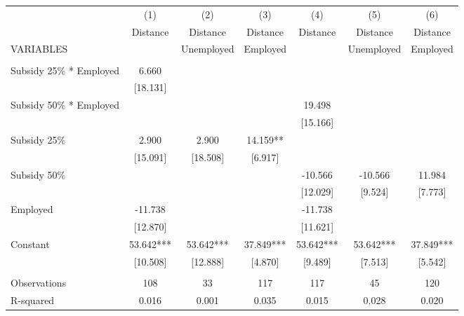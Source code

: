 \begin{tabular}{lcccccc} \hline
 & (1) & (2) & (3) & (4) & (5) & (6) \\
 & Distance & Distance & Distance & Distance & Distance & Distance \\
VARIABLES &  & Unemployed & Employed &  & Unemployed & Employed \\ \hline
 &  &  &  &  &  &  \\
Subsidy 25\% * Employed & 6.660 &  &  &  &  &  \\
 & [18.131] &  &  &  &  &  \\
Subsidy 50\% * Employed &  &  &  & 19.498 &  &  \\
 &  &  &  & [15.166] &  &  \\
Subsidy 25\% & 2.900 & 2.900 & 14.159** &  &  &  \\
 & [15.091] & [18.508] & [6.917] &  &  &  \\
Subsidy 50\% &  &  &  & -10.566 & -10.566 & 11.984 \\
 &  &  &  & [12.029] & [9.524] & [7.773] \\
Employed & -11.738 &  &  & -11.738 &  &  \\
 & [12.870] &  &  & [11.621] &  &  \\
Constant & 53.642*** & 53.642*** & 37.849*** & 53.642*** & 53.642*** & 37.849*** \\
 & [10.508] & [12.888] & [4.870] & [9.489] & [7.513] & [5.542] \\
 &  &  &  &  &  &  \\
Observations & 108 & 33 & 117 & 117 & 45 & 120 \\
 R-squared & 0.016 & 0.001 & 0.035 & 0.015 & 0.028 & 0.020 \\ \hline
\end{tabular}
